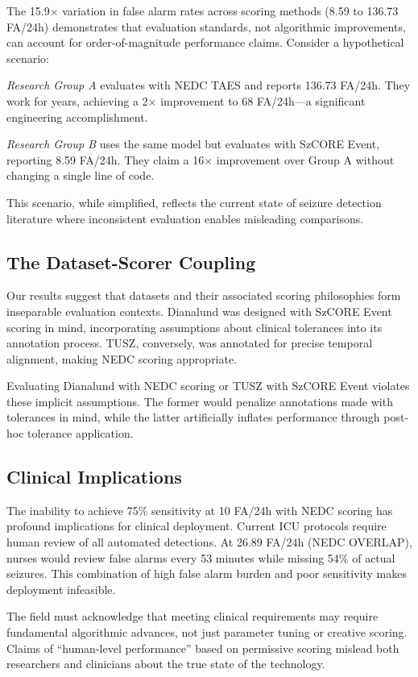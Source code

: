 \documentclass[10pt,a4paper]{article}
\begin{document}
The 15.9$\times$ variation in false alarm rates across scoring methods (8.59 to 136.73 FA/24h) demonstrates that evaluation standards, not algorithmic improvements, can account for order-of-magnitude performance claims. Consider a hypothetical scenario:

\textit{Research Group A} evaluates with NEDC TAES and reports 136.73 FA/24h. They work for years, achieving a 2$\times$ improvement to 68 FA/24h---a significant engineering accomplishment.

\textit{Research Group B} uses the same model but evaluates with SzCORE Event, reporting 8.59 FA/24h. They claim a 16$\times$ improvement over Group A without changing a single line of code.

This scenario, while simplified, reflects the current state of seizure detection literature where inconsistent evaluation enables misleading comparisons.

\subsection{The Dataset-Scorer Coupling}

Our results suggest that datasets and their associated scoring philosophies form inseparable evaluation contexts. Dianalund was designed with SzCORE Event scoring in mind, incorporating assumptions about clinical tolerances into its annotation process. TUSZ, conversely, was annotated for precise temporal alignment, making NEDC scoring appropriate.

Evaluating Dianalund with NEDC scoring or TUSZ with SzCORE Event violates these implicit assumptions. The former would penalize annotations made with tolerances in mind, while the latter artificially inflates performance through post-hoc tolerance application.

\subsection{Clinical Implications}

The inability to achieve 75\% sensitivity at 10 FA/24h with NEDC scoring has profound implications for clinical deployment. Current ICU protocols require human review of all automated detections. At 26.89 FA/24h (NEDC OVERLAP), nurses would review false alarms every 53 minutes while missing 54\% of actual seizures. This combination of high false alarm burden and poor sensitivity makes deployment infeasible.

The field must acknowledge that meeting clinical requirements may require fundamental algorithmic advances, not just parameter tuning or creative scoring. Claims of ``human-level performance'' based on permissive scoring mislead both researchers and clinicians about the true state of the technology.
\end{document}
